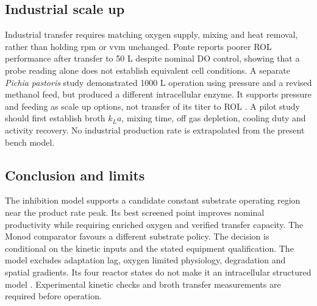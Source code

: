 \documentclass[12pt,a4paper]{article}
\newcommand{\pp}{\textit{Pichia pastoris}}
\begin{document}
\subsection{Industrial scale up}
Industrial transfer requires matching oxygen supply, mixing and heat removal, rather than holding rpm or vvm unchanged. Ponte reports poorer ROL performance after transfer to 50 L despite nominal DO control, showing that a probe reading alone does not establish equivalent cell conditions. A separate \pp{} study demonstrated 1000 L operation using pressure and a revised methanol feed, but produced a different intracellular enzyme. It supports pressure and feeding as scale up options, not transfer of its titer to ROL \cite{PonteThesis,ScaleUp}. A pilot study should first establish broth $k_La$, mixing time, off gas depletion, cooling duty and activity recovery. No industrial production rate is extrapolated from the present bench model.

\subsection{Conclusion and limits}
The inhibition model supports a candidate constant substrate operating region near the product rate peak. Its best screened point improves nominal productivity while requiring enriched oxygen and verified transfer capacity. The Monod comparator favours a different substrate policy. The decision is conditional on the kinetic inputs and the stated equipment qualification. The model excludes adaptation lag, oxygen limited physiology, degradation and spatial gradients. Its four reactor states do not make it an intracellular structured model \cite{CourseStructured}. Experimental kinetic checks and broth transfer measurements are required before operation.
\end{document}
